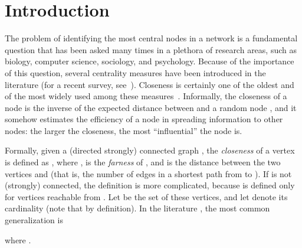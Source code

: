 \documentclass{acm_proc_article-sp}
\begin{document}
\section{Introduction}
The problem of identifying the most central nodes in a network is a fundamental question that has been asked many times in a plethora of research areas, such as biology, computer science, sociology, and psychology. Because of the importance of this question, several centrality measures have been introduced in the literature (for a recent survey, see~\cite{Boldi2014}). Closeness is certainly one of the oldest and of the most widely used among these measures~\cite{Bavelas1950}. Informally, the closeness of a node  is the inverse of the expected distance between  and a random node , and it somehow estimates the efficiency of a node in spreading information to other nodes: the larger the closeness, the most ``influential'' the node is.

Formally, given a (directed strongly) connected graph , the \textit{closeness} of a vertex  is defined as , where ,  is the \textit{farness} of , and  is the distance between the two vertices  and  (that is, the number of edges in a shortest path from  to ). If  is not (strongly) connected, the definition is more complicated, because  is defined only for vertices reachable from . Let  be the set of these vertices, and let  denote its cardinality (note that  by definition). In the literature \cite{Lin1976,Wasserman1994,Olsen2014}, the most common generalization is

where .
\end{document}
